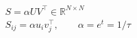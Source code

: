 \documentclass[border=6pt]{standalone}
\begin{document}
\color{ink}\begin{minipage}{165pt}\centering$\displaystyle \begin{gathered}S=\alpha UV^\top\in\mathbb{R}^{N\times N}\\S_{ij}=\alpha u_i v_j^\top,\qquad\alpha=e^t=1/\tau\end{gathered}$\end{minipage}
\end{document}
